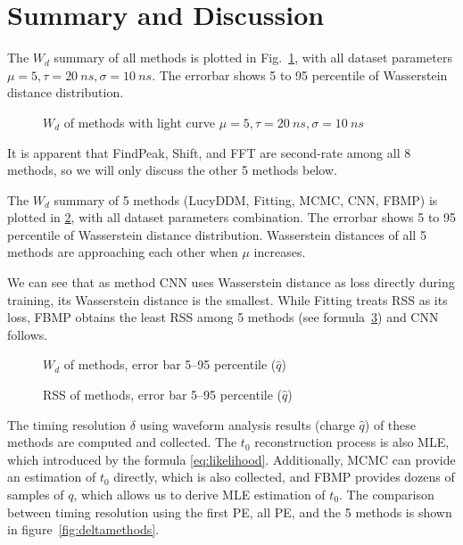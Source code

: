 \section{Summary and Discussion} %
\label{sec:discussion}

The $W_{d}$ summary of all methods is plotted in Fig.~\ref{fig:chargesummary}, with all dataset parameters $\mu=5, \tau=\SI{20}{ns}, \sigma=\SI{10}{ns}$. The errorbar shows 5 to 95 percentile of Wasserstein distance distribution. 

\begin{figure}[H]
    \centering
    \scalebox{0.7}{}
    \caption{\label{fig:chargesummary} $W_{d}$ of methods with light curve $\mu=5, \tau=\SI{20}{ns}, \sigma=\SI{10}{ns}$}
\end{figure}

It is apparent that FindPeak, Shift, and FFT are second-rate among all 8 methods, so we will only discuss the other 5 methods below. 


The $W_{d}$ summary of 5 methods (LucyDDM, Fitting, MCMC, CNN, FBMP) is plotted in \ref{fig:wdistsummary}, with all dataset parameters combination. The errorbar shows 5 to 95 percentile of Wasserstein distance distribution. Wasserstein distances of all 5 methods are approaching each other when $\mu$ increases. 

We can see that as method CNN uses Wasserstein distance as loss directly during training, its Wasserstein distance is the smallest. While Fitting treats RSS as its loss, FBMP obtains the least RSS among 5 methods (see formula~\ref{fig:rsssummary}) and CNN follows. 

\begin{figure}[H]
    \centering
    \resizebox{\textwidth}{!}{}
    \caption{\label{fig:wdistsummary} $W_{d}$ of methods, error bar 5--95 percentile ($\hat{q}$)}
\end{figure}

\begin{figure}[H]
    \centering
    \resizebox{\textwidth}{!}{}
    \caption{\label{fig:rsssummary} RSS of methods, error bar 5--95 percentile ($\hat{q}$)}
\end{figure}

The timing resolution $\delta$ using waveform analysis results (charge $\hat{q}$) of these methods are computed and collected. The $t_{0}$ reconstruction process is also MLE, which introduced by the formula \eqref{eq:likelihood}. Additionally, MCMC can provide an estimation of $t_{0}$ directly, which is also collected, and FBMP provides dozens of samples of $q$, which allows us to derive MLE estimation of $t_{0}$. The comparison between timing resolution using the first PE, all PE, and the 5 methods is shown in figure~\ref{fig:deltamethods}. 

